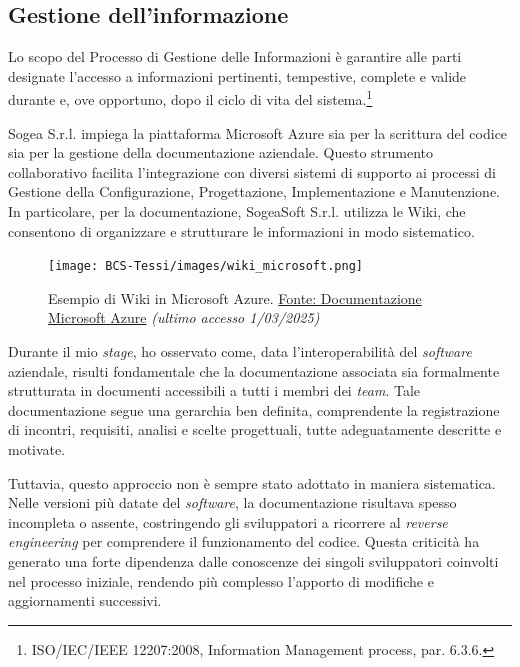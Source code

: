         \subsection{Gestione dell’informazione}

        Lo scopo del Processo di Gestione delle Informazioni è garantire alle parti designate l’accesso a informazioni pertinenti, tempestive, complete e valide durante e, ove opportuno, dopo il ciclo di vita del sistema.\footnote{ISO/IEC/IEEE 12207:2008, Information Management process, par. 6.3.6.}

        \noindent Sogea S.r.l. impiega la piattaforma Microsoft Azure sia per la scrittura del codice sia per la gestione della documentazione aziendale. Questo strumento collaborativo facilita l'integrazione con diversi sistemi di supporto ai processi di Gestione della Configurazione, Progettazione, Implementazione e Manutenzione. In particolare, per la documentazione, SogeaSoft S.r.l. utilizza le Wiki, che consentono di organizzare e strutturare le informazioni in modo sistematico.  

        \begin{figure}[H]
            \centering
            \texttt{[image: BCS-Tessi/images/wiki\_microsoft.png]}
            \caption[Microsoft Azure, Wiki]{Esempio di Wiki in Microsoft Azure. \href{https://learn.microsoft.com/it-it/azure/devops/project/wiki/wiki-create-repo?view=azure-devopstabs=browser}{Fonte: Documentazione Microsoft Azure} \textit{(ultimo accesso 1/03/2025)}}
            \label{fig:Wiki}
        \end{figure}

        \noindent Durante il mio \textit{stage}, ho osservato come, data l’interoperabilità del \textit{software} aziendale, risulti fondamentale che la documentazione associata sia formalmente strutturata in documenti accessibili a tutti i membri dei \textit{team}. Tale documentazione segue una gerarchia ben definita, comprendente la registrazione di incontri, requisiti, analisi e scelte progettuali, tutte adeguatamente descritte e motivate.  

        \noindent Tuttavia, questo approccio non è sempre stato adottato in maniera sistematica. Nelle versioni più datate del \textit{software}, la documentazione risultava spesso incompleta o assente, costringendo gli sviluppatori a ricorrere al \textit{reverse engineering} per comprendere il funzionamento del codice. Questa criticità ha generato una forte dipendenza dalle conoscenze dei singoli sviluppatori coinvolti nel processo iniziale, rendendo più complesso l’apporto di modifiche e aggiornamenti successivi.  

